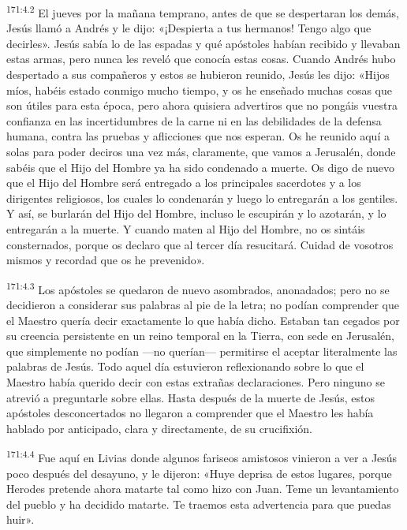 \par 
\textsuperscript{171:4.2} El jueves por la mañana temprano, antes de que se despertaran los demás, Jesús llamó a Andrés y le dijo: «¡Despierta a tus hermanos! Tengo algo que decirles». Jesús sabía lo de las espadas y qué apóstoles habían recibido y llevaban estas armas, pero nunca les reveló que conocía estas cosas. Cuando Andrés hubo despertado a sus compañeros y estos se hubieron reunido, Jesús les dijo: «Hijos míos, habéis estado conmigo mucho tiempo, y os he enseñado muchas cosas que son útiles para esta época, pero ahora quisiera advertiros que no pongáis vuestra confianza en las incertidumbres de la carne ni en las debilidades de la defensa humana, contra las pruebas y aflicciones que nos esperan. Os he reunido aquí a solas para poder deciros una vez más, claramente, que vamos a Jerusalén, donde sabéis que el Hijo del Hombre ya ha sido condenado a muerte. Os digo de nuevo que el Hijo del Hombre será entregado a los principales sacerdotes y a los dirigentes religiosos, los cuales lo condenarán y luego lo entregarán a los gentiles. Y así, se burlarán del Hijo del Hombre, incluso le escupirán y lo azotarán, y lo entregarán a la muerte. Y cuando maten al Hijo del Hombre, no os sintáis consternados, porque os declaro que al tercer día resucitará. Cuidad de vosotros mismos y recordad que os he prevenido».

\par 
\textsuperscript{171:4.3} Los apóstoles se quedaron de nuevo asombrados, anonadados; pero no se decidieron a considerar sus palabras al pie de la letra; no podían comprender que el Maestro quería decir exactamente lo que había dicho. Estaban tan cegados por su creencia persistente en un reino temporal en la Tierra, con sede en Jerusalén, que simplemente no podían ---no querían--- permitirse el aceptar literalmente las palabras de Jesús. Todo aquel día estuvieron reflexionando sobre lo que el Maestro había querido decir con estas extrañas declaraciones. Pero ninguno se atrevió a preguntarle sobre ellas. Hasta después de la muerte de Jesús, estos apóstoles desconcertados no llegaron a comprender que el Maestro les había hablado por anticipado, clara y directamente, de su crucifixión.

\par 
\textsuperscript{171:4.4} Fue aquí en Livias donde algunos fariseos amistosos vinieron a ver a Jesús poco después del desayuno, y le dijeron: «Huye deprisa de estos lugares, porque Herodes pretende ahora matarte tal como hizo con Juan. Teme un levantamiento del pueblo y ha decidido matarte. Te traemos esta advertencia para que puedas huir».


